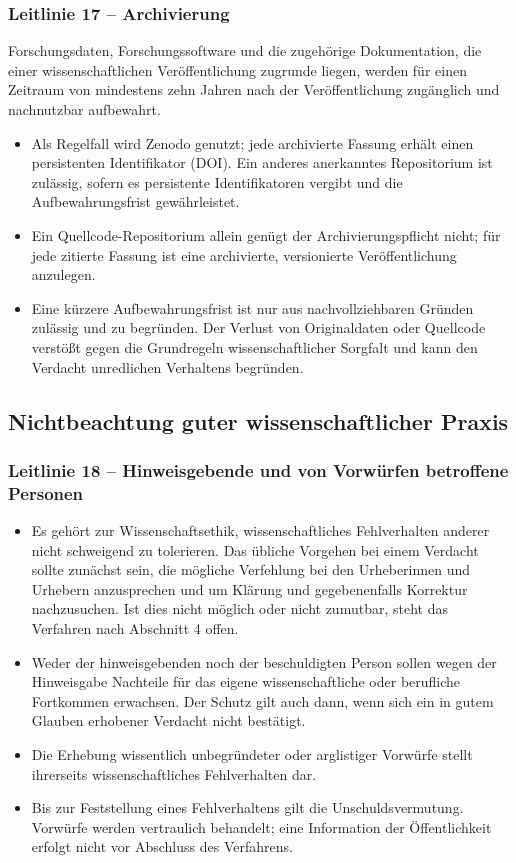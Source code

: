 \documentclass[a4paper, fontsize=11pt]{scrartcl}
\begin{document}
\subsubsection*{Leitlinie 17 -- Archivierung}
Forschungsdaten, Forschungssoftware und die zugehörige Dokumentation, die einer wissenschaftlichen Veröffentlichung zugrunde liegen, werden für einen Zeitraum von mindestens zehn Jahren nach der Veröffentlichung zugänglich und nachnutzbar aufbewahrt.
\begin{itemize}
  \item Als Regelfall wird Zenodo genutzt; jede archivierte Fassung erhält einen persistenten Identifikator (DOI). Ein anderes anerkanntes Repositorium ist zulässig, sofern es persistente Identifikatoren vergibt und die Aufbewahrungsfrist gewährleistet.
  \item Ein Quellcode-Repositorium allein genügt der Archivierungspflicht nicht; für jede zitierte Fassung ist eine archivierte, versionierte Veröffentlichung anzulegen.
  \item Eine kürzere Aufbewahrungsfrist ist nur aus nachvollziehbaren Gründen zulässig und zu begründen. Der Verlust von Originaldaten oder Quellcode verstößt gegen die Grundregeln wissenschaftlicher Sorgfalt und kann den Verdacht unredlichen Verhaltens begründen.
\end{itemize}

\subsection{Nichtbeachtung guter wissenschaftlicher Praxis}

\subsubsection*{Leitlinie 18 -- Hinweisgebende und von Vorwürfen betroffene Personen}
\begin{itemize}
  \item Es gehört zur Wissenschaftsethik, wissenschaftliches Fehlverhalten anderer nicht schweigend zu tolerieren. Das übliche Vorgehen bei einem Verdacht sollte zunächst sein, die mögliche Verfehlung bei den Urheberinnen und Urhebern anzusprechen und um Klärung und gegebenenfalls Korrektur nachzusuchen. Ist dies nicht möglich oder nicht zumutbar, steht das Verfahren nach Abschnitt 4 offen.
  \item Weder der hinweisgebenden noch der beschuldigten Person sollen wegen der Hinweisgabe Nachteile für das eigene wissenschaftliche oder berufliche Fortkommen erwachsen. Der Schutz gilt auch dann, wenn sich ein in gutem Glauben erhobener Verdacht nicht bestätigt.
  \item Die Erhebung wissentlich unbegründeter oder arglistiger Vorwürfe stellt ihrerseits wissenschaftliches Fehlverhalten dar.
  \item Bis zur Feststellung eines Fehlverhaltens gilt die Unschuldsvermutung. Vorwürfe werden vertraulich behandelt; eine Information der Öffentlichkeit erfolgt nicht vor Abschluss des Verfahrens.
\end{itemize}
\end{document}
